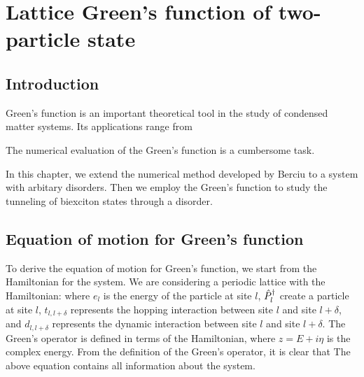 \chapter{Lattice Green's function of two-particle state}
\label{ch:greenfunc}

\section{Introduction}
\label{sec:introGreenFunc}

Green's function is an important theoretical tool in the study of condensed matter systems. Its applications range from

The numerical evaluation of the Green's function is a cumbersome task.

In this chapter, we extend the numerical method \cite{Berciu2010, Berciu2011, Berciu2012} developed by Berciu to a system with arbitary disorders. Then we employ the Green's function to study the tunneling of biexciton states through
a disorder. 

\section{Equation of motion for Green's function}
\label{sec:equationOfMotion}

To derive the equation of motion for Green's function, we start from the Hamiltonian for the system. We are 
considering a periodic lattice with the Hamiltonian:
where $e_l$ is the energy of the particle at site $l$, $\hat{P}^{\dagger}_{l}$ create a particle at site $l$, $t_{l, l+\delta}$ represents the hopping interaction between
site $l$ and site $l+\delta$, and $d_{l, l+\delta}$ represents the dynamic interaction between
site $l$ and site $l+\delta$. The Green's operator is defined in terms of the Hamiltonian,
where $z = E + i\eta$ is the complex energy. From the definition of the Green's operator, it is clear that  
The above equation contains all information about the system. 

